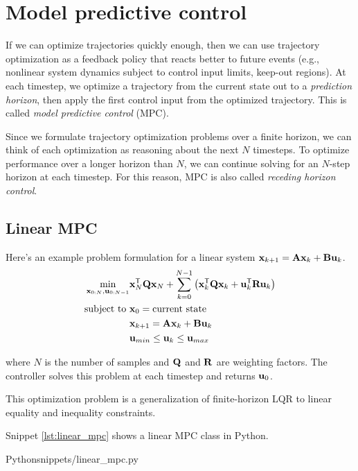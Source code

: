 \section{Model predictive control}

If we can optimize trajectories quickly enough, then we can use trajectory
optimization as a feedback policy that reacts better to future events (e.g.,
nonlinear system dynamics subject to control input limits, keep-out regions). At
each timestep, we optimize a trajectory from the current state out to a
\textit{prediction horizon}, then apply the first control input from the
optimized trajectory. This is called \textit{model predictive control} (MPC).

Since we formulate trajectory optimization problems over a finite horizon, we
can think of each optimization as reasoning about the next $N$ timesteps. To
optimize performance over a longer horizon than $N$, we can continue solving for
an $N$-step horizon at each timestep. For this reason, MPC is also called
\textit{receding horizon control}.

\subsection{Linear MPC}

Here's an example problem formulation for a linear system
$\mathbf{x}_{k+1} = \mathbf{A}\mathbf{x}_k + \mathbf{B}\mathbf{u}_k$.
\begin{align*}
  \min_{\mathbf{x}_{0:N}, \mathbf{u}_{0:N-1}}
    &\mathbf{x}_N^\mathsf{T}\mathbf{Q}\mathbf{x}_N +
     \sum_{k=0}^{N-1} \left(\mathbf{x}_k^\mathsf{T}\mathbf{Q}\mathbf{x}_k + \mathbf{u}_k^\mathsf{T}\mathbf{R}\mathbf{u}_k\right) \\
  \text{subject to } &\mathbf{x}_0 = \text{current state} \\
                     &\mathbf{x}_{k+1} = \mathbf{A}\mathbf{x}_k + \mathbf{B}\mathbf{u}_k \\
                     &\mathbf{u}_{min} \leq \mathbf{u}_k \leq \mathbf{u}_{max}
\end{align*}

where $N$ is the number of samples and $\mathbf{Q}$ and $\mathbf{R}$ are weighting
factors. The controller solves this problem at each timestep and returns
$\mathbf{u}_0$.
\begin{remark}
  This optimization problem is a generalization of finite-horizon LQR to linear
  equality and inequality constraints.
\end{remark}

Snippet \ref{lst:linear_mpc} shows a linear MPC class in Python.
\begin{coderemote}{Python}{snippets/linear_mpc.py}
  \caption{Linear MPC class in Python}
  \label{lst:linear_mpc}
\end{coderemote}

